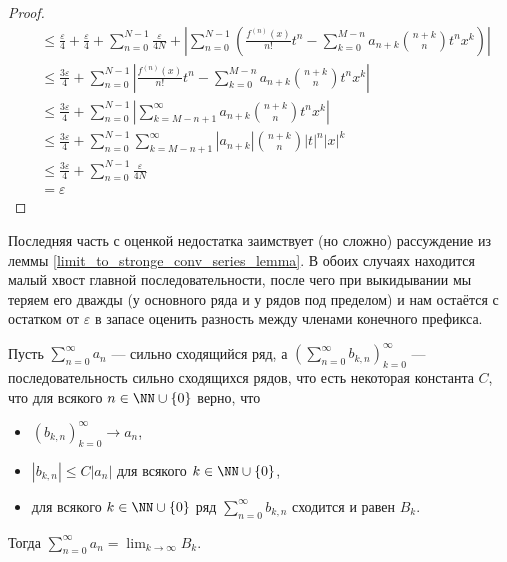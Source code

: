 \documentclass[12pt,a4paper]{article}
\begin{document}
\begin{proof}
\begin{align*}
            &\leqslant
                \frac{\varepsilon}{4} + \frac{\varepsilon}{4}
                + \sum_{n=0}^{N-1} \frac{\varepsilon}{4N}
                + \left|\sum_{n=0}^{N-1} \left(\frac{f^{(n)}(x)}{n!}t^n - \sum_{k=0}^{M-n} a_{n+k} \binom{n+k}{n} t^n x^k\right)\right|\\
            &\leqslant
                \frac{3\varepsilon}{4}
                + \sum_{n=0}^{N-1} \left|\frac{f^{(n)}(x)}{n!}t^n - \sum_{k=0}^{M-n} a_{n+k} \binom{n+k}{n} t^n x^k\right|\\
            &\leqslant
                \frac{3\varepsilon}{4}
                + \sum_{n=0}^{N-1} \left|\sum_{k=M-n+1}^\infty a_{n+k} \binom{n+k}{n} t^n x^k\right|\\
            &\leqslant
                \frac{3\varepsilon}{4}
                + \sum_{n=0}^{N-1} \sum_{k=M-n+1}^\infty |a_{n+k}| \binom{n+k}{n} |t|^n |x|^k\\
            &\leqslant
                \frac{3\varepsilon}{4}
                + \sum_{n=0}^{N-1} \frac{\varepsilon}{4N}\\
            &= \varepsilon
        \end{align*}
    \end{proof}

    \begin{remark*}
        Последняя часть с оценкой недостатка заимствует (но сложно) рассуждение из леммы \ref{limit_to_stronge_conv_series_lemma}. В обоих случаях находится малый хвост главной последовательности, после чего при выкидывании мы теряем его дважды (у основного ряда и у рядов под пределом) и нам остаётся с остатком от $\varepsilon$ в запасе оценить разность между членами конечного префикса.
    \end{remark*}

    \begin{lemma}\label{limit_to_stronge_conv_series_lemma}
        Пусть $\sum_{n=0}^\infty a_n$ --- сильно сходящийся ряд, а $(\sum_{n=0}^\infty b_{k,n})_{k=0}^\infty$ --- последовательность сильно сходящихся рядов, что есть некоторая константа $C$, что для всякого $n \in \NN \cup \{0\}$ верно, что
        \begin{itemize}
            \item $(b_{k, n})_{k=0}^\infty \to a_n$,
            \item $|b_{k, n}| \leqslant C |a_n|$ для всякого $k \in \NN \cup \{0\}$,
            \item для всякого $k \in \NN \cup \{0\}$ ряд $\sum_{n=0}^\infty b_{k,n}$ сходится и равен $B_k$.
        \end{itemize}
        Тогда $\sum_{n=0}^\infty a_n = \lim_{k \to \infty} B_k$.
    \end{lemma}
\end{document}
